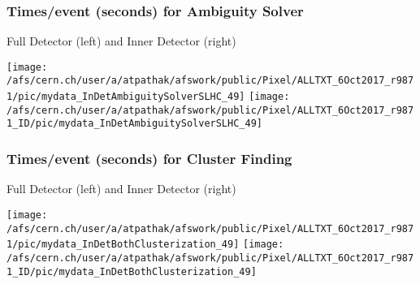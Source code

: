 \documentclass{beamer}
\begin{document}
\begin{frame}
\frametitle{Times/event (seconds) for Ambiguity Solver}
\begin{center}
\begin{normalsize}
Full Detector (left)  and Inner Detector (right) \\
\vspace*{-.2cm}
\begin{center}
\texttt{[image: /afs/cern.ch/user/a/atpathak/afswork/public/Pixel/ALLTXT\_6Oct2017\_r9871/pic/mydata\_InDetAmbiguitySolverSLHC\_49]}
\texttt{[image: /afs/cern.ch/user/a/atpathak/afswork/public/Pixel/ALLTXT\_6Oct2017\_r9871\_ID/pic/mydata\_InDetAmbiguitySolverSLHC\_49]}

\end{center}
\end{normalsize}
\end{center}
\end{frame}
\begin{frame}
\frametitle{Times/event (seconds) for Cluster Finding}
\begin{center}
\begin{normalsize}
Full Detector (left)  and Inner Detector (right) \\
\vspace*{-.2cm}
\begin{center}
\texttt{[image: /afs/cern.ch/user/a/atpathak/afswork/public/Pixel/ALLTXT\_6Oct2017\_r9871/pic/mydata\_InDetBothClusterization\_49]}
\texttt{[image: /afs/cern.ch/user/a/atpathak/afswork/public/Pixel/ALLTXT\_6Oct2017\_r9871\_ID/pic/mydata\_InDetBothClusterization\_49]}

\end{center}
\end{normalsize}
\end{center}
\end{frame}
\end{document}
